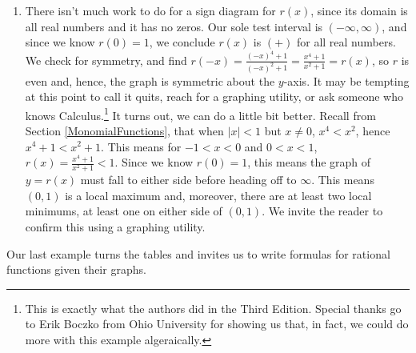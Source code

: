 \documentclass{ximera}
\begin{document}
\begin{example}
\begin{enumerate}
\item  There isn't much work to do for a sign diagram for $r(x)$, since its domain is all real numbers and it has no zeros.  Our sole test interval is $(-\infty, \infty)$, and since we know $r(0) = 1$, we conclude $r(x)$ is $(+)$ for all real numbers.   We check for symmetry, and find $r(-x) = \frac{(-x)^4+1}{(-x)^2+1} = \frac{x^4+1}{x^2+1} = r(x)$, so $r$ is even and, hence, the graph is symmetric about the $y$-axis.  It may be tempting at this point to call it quits, reach for a graphing utility, or ask someone who knows Calculus.\footnote{This is exactly what the authors did in the Third Edition. Special thanks go to Erik Boczko from Ohio University for showing us that, in fact, we could do more with this example algeraically.}  It turns out, we can do a little bit better.  Recall from Section \ref{MonomialFunctions}, that when $|x| <1$ but $x \neq 0$, $x^4 < x^2$, hence $x^4+1 < x^2+1$.  This means for $-1<x<0$ and $0<x<1$, $r(x) = \frac{x^4+1}{x^2+1} < 1$. Since we know $r(0) = 1$, this means the graph of $y = r(x)$ must fall to either side before heading off to $\infty$.  This means $(0,1)$ is a local maximum and, moreover, there are at least two local minimums, at least one on either side of $(0,1)$.  We invite the reader to confirm this using a graphing utility. 


\begin{center}
\end{center}

\end{enumerate}


\end{example}


Our last example turns the tables and invites us to write formulas for rational functions given their graphs.
\end{document}
